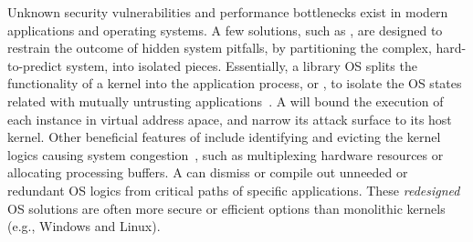 Unknown security vulnerabilities and performance bottlenecks exist
in modern applications and operating systems.
A few solutions, such as \term{\liboses{}},
are designed to restrain
the outcome of hidden system pitfalls, %
by partitioning the complex, hard-to-predict system,
into isolated pieces.
Essentially, a library OS
splits the functionality of a kernel into
the application process,
or \term{\picoprocs{}},
to isolate the OS states related with mutually untrusting applications~\citep{porter11drawbridge, baumann13bascule, unikernels}.
A \picoproc{} will bound the execution of each\libos{} instance
in virtual address apace,
and narrow its attack surface to its host kernel.
Other beneficial features of \liboses{}
include
identifying and evicting the kernel logics causing system congestion~\citep{engler95exokernel, leslie96nemesis, unikernels},
such as multiplexing hardware resources or allocating processing buffers.
A \libos{} can
dismiss or compile out
unneeded or redundant OS logics
from critical paths of specific applications.
These \emph{redesigned} OS solutions are often more secure or efficient options
than monolithic kernels
(e.g., Windows and Linux).





